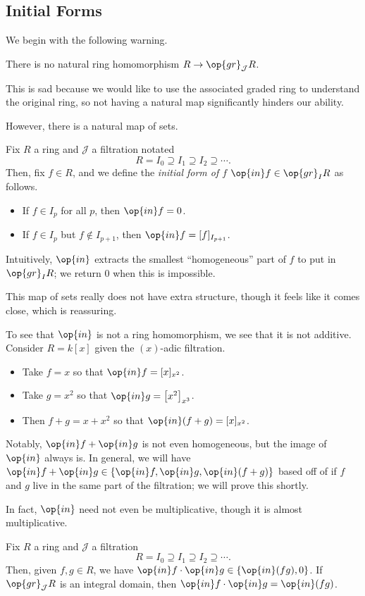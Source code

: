 \subsection{Initial Forms}
We begin with the following warning.
\begin{warn}
	There is no natural ring homomorphism $R\to\op{gr}_{\mathcal J}R$.
\end{warn}
This is sad because we would like to use the associated graded ring to understand the original ring, so not having a natural map significantly hinders our ability.

However, there is a natural map of sets.
\begin{definition}
	Fix $R$ a ring and $\mathcal J$ a filtration notated
	\[R=I_0\supseteq I_1\supseteq I_2\supseteq\cdots.\]
	Then, fix $f\in R$, and we define the \textit{initial form of $f$} $\op{in}f\in\op{gr}_IR$ as follows.
	\begin{itemize}
		\item If $f\in I_p$ for all $p$, then $\op{in}f=0$.
		\item If $f\in I_p$ but $f\notin I_{p+1}$, then $\op{in}f=[f]_{I_{p+1}}$.
	\end{itemize}
	Intuitively, $\op{in}$ extracts the smallest ``homogeneous'' part of $f$ to put in $\op{gr}_IR$; we return $0$ when this is impossible.
\end{definition}
This map of sets really does not have extra structure, though it feels like it comes close, which is reassuring.
\begin{remark}[Nir]
	To see that $\op{in}$ is not a ring homomorphism, we see that it is not additive. Consider $R=k[x]$ given the $(x)$-adic filtration.
	\begin{itemize}
		\item Take $f=x$ so that $\op{in}f=[x]_{x^2}$.
		\item Take $g=x^2$ so that $\op{in}g=\left[x^2\right]_{x^3}$.
		\item Then $f+g=x+x^2$ so that $\op{in}(f+g)=[x]_{x^2}$.
	\end{itemize}
	Notably, $\op{in}f+\op{in}g$ is not even homogeneous, but the image of $\op{in}$ always is. In general, we will have $\op{in}f+\op{in}g\in\{\op{in}f,\op{in}g,\op{in}(f+g)\}$ based off of if $f$ and $g$ live in the same part of the filtration; we will prove this shortly.
\end{remark}
In fact, $\op{in}$ need not even be multiplicative, though it is almost multiplicative.
\begin{proposition}
	Fix $R$ a ring and $\mathcal J$ a filtration
	\[R=I_0\supseteq I_1\supseteq I_2\supseteq\cdots.\]
	Then, given $f,g\in R$, we have $\op{in}f\cdot\op{in}g\in\{\op{in}(fg),0\}$. If $\op{gr}_\mathcal JR$ is an integral domain, then $\op{in}f\cdot\op{in}g=\op{in}(fg)$.
\end{proposition}
